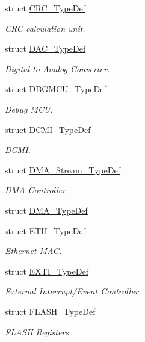 \begin{DoxyCompactItemize}
struct \hyperlink{struct_c_r_c___type_def}{C\-R\-C\-\_\-\-Type\-Def}
\begin{DoxyCompactList}\small\item\em C\-R\-C calculation unit. \end{DoxyCompactList}\item 
struct \hyperlink{struct_d_a_c___type_def}{D\-A\-C\-\_\-\-Type\-Def}
\begin{DoxyCompactList}\small\item\em Digital to Analog Converter. \end{DoxyCompactList}\item 
struct \hyperlink{struct_d_b_g_m_c_u___type_def}{D\-B\-G\-M\-C\-U\-\_\-\-Type\-Def}
\begin{DoxyCompactList}\small\item\em Debug M\-C\-U. \end{DoxyCompactList}\item 
struct \hyperlink{struct_d_c_m_i___type_def}{D\-C\-M\-I\-\_\-\-Type\-Def}
\begin{DoxyCompactList}\small\item\em D\-C\-M\-I. \end{DoxyCompactList}\item 
struct \hyperlink{struct_d_m_a___stream___type_def}{D\-M\-A\-\_\-\-Stream\-\_\-\-Type\-Def}
\begin{DoxyCompactList}\small\item\em D\-M\-A Controller. \end{DoxyCompactList}\item 
struct \hyperlink{struct_d_m_a___type_def}{D\-M\-A\-\_\-\-Type\-Def}
\item 
struct \hyperlink{struct_e_t_h___type_def}{E\-T\-H\-\_\-\-Type\-Def}
\begin{DoxyCompactList}\small\item\em Ethernet M\-A\-C. \end{DoxyCompactList}\item 
struct \hyperlink{struct_e_x_t_i___type_def}{E\-X\-T\-I\-\_\-\-Type\-Def}
\begin{DoxyCompactList}\small\item\em External Interrupt/\-Event Controller. \end{DoxyCompactList}\item 
struct \hyperlink{struct_f_l_a_s_h___type_def}{F\-L\-A\-S\-H\-\_\-\-Type\-Def}
\begin{DoxyCompactList}\small\item\em F\-L\-A\-S\-H Registers. \end{DoxyCompactList}\item 

\end{DoxyCompactItemize}
